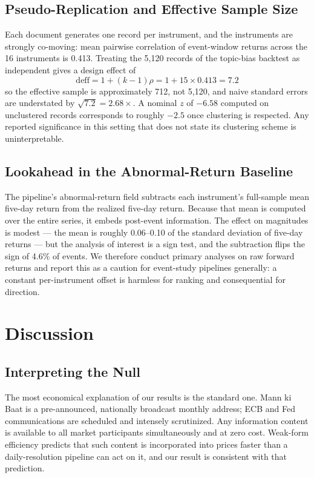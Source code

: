 \documentclass[11pt]{article}
\begin{document}
\subsection{Pseudo-Replication and Effective Sample Size}

Each document generates one record per instrument, and the instruments are strongly co-moving: mean pairwise correlation of event-window returns across the 16 instruments is 0.413. Treating the 5{,}120 records of the topic-bias backtest as independent gives a design effect of
\begin{equation}
\text{deff} = 1 + (k - 1)\rho = 1 + 15 \times 0.413 = 7.2
\label{eq:deff}
\end{equation}
so the effective sample is approximately 712, not 5{,}120, and naive standard errors are understated by $\sqrt{7.2} = 2.68\times$. A nominal $z$ of $-6.58$ computed on unclustered records corresponds to roughly $-2.5$ once clustering is respected. Any reported significance in this setting that does not state its clustering scheme is uninterpretable.

\subsection{Lookahead in the Abnormal-Return Baseline}

The pipeline's abnormal-return field subtracts each instrument's full-sample mean five-day return from the realized five-day return. Because that mean is computed over the entire series, it embeds post-event information. The effect on magnitudes is modest --- the mean is roughly 0.06--0.10 of the standard deviation of five-day returns --- but the analysis of interest is a sign test, and the subtraction flips the sign of 4.6\% of events. We therefore conduct primary analyses on raw forward returns and report this as a caution for event-study pipelines generally: a constant per-instrument offset is harmless for ranking and consequential for direction.

\section{Discussion}
\label{sec:discussion}

\subsection{Interpreting the Null}

The most economical explanation of our results is the standard one. Mann ki Baat is a pre-announced, nationally broadcast monthly address; ECB and Fed communications are scheduled and intensely scrutinized. Any information content is available to all market participants simultaneously and at zero cost. Weak-form efficiency \cite{fama1970} predicts that such content is incorporated into prices faster than a daily-resolution pipeline can act on it, and our result is consistent with that prediction.
\end{document}
